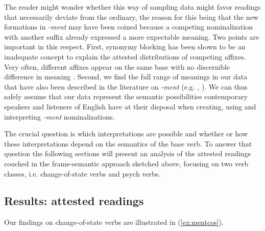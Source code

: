 \documentclass[output=paper]{langsci/langscibook}
\begin{document}
The reader might wonder whether this way of sampling data might favor readings that necessarily deviate from the ordinary, the reason for this being that the new formations in \textit{-ment} may have been coined because a competing nominalization with another suffix already expressed a more expectable meaning. Two points are important in this respect. First, synonymy blocking has been shown to be an inadequate concept to explain the attested distributions of competing affixes. Very often, different affixes appear on the same base with no discernible difference in meaning \citep[e.g.][section 26.4]{Bauer.2013}. Second, we find the full range of meanings in our data that have also been described in the literature on \textit{-ment} (e.g. \citealt{Bauer.2013}, \citealt{Marchand.1969}). We can thus safely assume that our data represent the semantic possibilities  contemporary speakers and listeners of English have at their disposal when creating, using  and interpreting \textit{-ment} nominalizations.

The crucial question is which interpretations are possible and whether or how these interpretations depend on the semantics of the base verb. To answer that question the following sections will present an analysis of the attested readings couched in the frame-semantic approach sketched above, focusing on two verb classes, i.e. change-of-state verbs and psych verbs.


\subsection{Results: attested readings}\label{sec:Results: attested readings}

Our findings on change-of-state verbs are illustrated in (\ref{ex:mentcos}).
\end{document}
